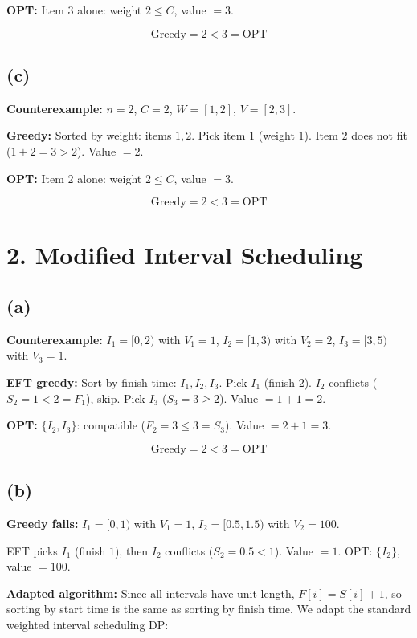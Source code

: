 \documentclass[11pt]{article}
\begin{document}
\textbf{OPT:} Item $3$ alone: weight $2 \le C$, value $= 3$.

\[
\boxed{\text{Greedy} = 2 < 3 = \text{OPT}}
\]

\subsection*{(c)}

\textbf{Counterexample:} $n = 2$, $C = 2$, $W = [1, 2]$, $V = [2, 3]$.

\textbf{Greedy:} Sorted by weight: items $1, 2$. Pick item $1$ (weight $1$). Item $2$ does not fit ($1 + 2 = 3 > 2$). Value $= 2$.

\textbf{OPT:} Item $2$ alone: weight $2 \le C$, value $= 3$.

\[
\boxed{\text{Greedy} = 2 < 3 = \text{OPT}}
\]


\section*{2. Modified Interval Scheduling}

\subsection*{(a)}

\textbf{Counterexample:} $I_1 = [0, 2)$ with $V_1 = 1$, \; $I_2 = [1, 3)$ with $V_2 = 2$, \; $I_3 = [3, 5)$ with $V_3 = 1$.

\textbf{EFT greedy:} Sort by finish time: $I_1, I_2, I_3$. Pick $I_1$ (finish $2$). $I_2$ conflicts ($S_2 = 1 < 2 = F_1$), skip. Pick $I_3$ ($S_3 = 3 \ge 2$). Value $= 1 + 1 = 2$.

\textbf{OPT:} $\{I_2, I_3\}$: compatible ($F_2 = 3 \le 3 = S_3$). Value $= 2 + 1 = 3$.

\[
\boxed{\text{Greedy} = 2 < 3 = \text{OPT}}
\]

\subsection*{(b)}

\textbf{Greedy fails:} $I_1 = [0, 1)$ with $V_1 = 1$, \; $I_2 = [0.5, 1.5)$ with $V_2 = 100$.

EFT picks $I_1$ (finish $1$), then $I_2$ conflicts ($S_2 = 0.5 < 1$). Value $= 1$. OPT: $\{I_2\}$, value $= 100$.

\textbf{Adapted algorithm:}
Since all intervals have unit length, $F[i] = S[i] + 1$, so sorting by start time is the same as sorting by finish time. We adapt the standard weighted interval scheduling DP:
\end{document}
